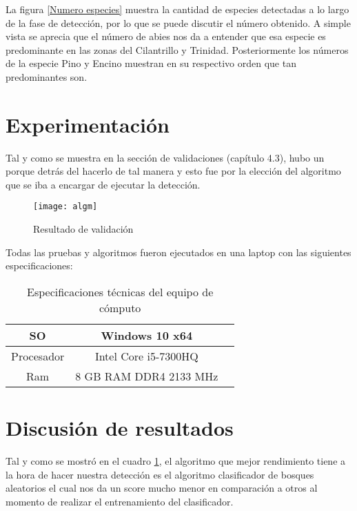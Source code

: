 La figura \ref{Numero especies} muestra la cantidad de especies detectadas a lo largo de la fase de detección, por lo que se puede discutir el número obtenido. A simple vista se aprecia que el número de abies nos da a entender que esa especie es predominante en las zonas del Cilantrillo y Trinidad. Posteriormente los números de la especie Pino y Encino muestran en su respectivo orden que tan predominantes son.

\section{Experimentación}
Tal y como se muestra en la sección de validaciones (capítulo 4.3), hubo un porque detrás del hacerlo de tal manera y esto fue por la elección del algoritmo que se iba a encargar de ejecutar la detección.


\begin{figure}[H]
  \centering
  \begin{minipage}[b]{0.8\textwidth}
        \texttt{[image: algm]}
    \caption{Resultado de validación}
  \end{minipage}
\end{figure}


Todas las pruebas y algoritmos fueron ejecutados en una laptop con las siguientes especificaciones:

\begin{table}[H]
	{\centering
		\begin{tabular}{|c|c|c|}
			\hline
			SO & Windows 10 x64\\
			\hline
			Procesador & Intel Core i5-7300HQ\\
			\hline
			Ram & 8 GB RAM DDR4 2133 MHz\\
			\hline
		\end{tabular}
	\caption{Especificaciones técnicas del equipo de cómputo}
	\label{tab:Especificaciones técnicas del PC}
	}
\end{table}

\break

\section{Discusión de resultados}
Tal y como se mostró en el cuadro \ref{tab:Especificaciones técnicas del PC}, el algoritmo que mejor rendimiento tiene a la hora de hacer nuestra detección es el algoritmo clasificador de bosques aleatorios el cual nos da un score mucho menor en comparación a otros al momento de realizar el entrenamiento del clasificador.

